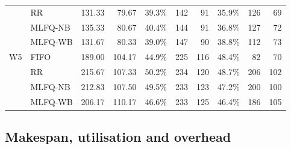 \documentclass[11pt,a4paper]{article}
\begin{document}
\begin{center}
\begin{tabular}{ll rrr rrr rr}
 & RR & 131.33 & 79.67 & 39.3\% & 142 & 91 & 35.9\% & 126 & 69 \\
 & MLFQ-NB & 135.33 & 80.67 & 40.4\% & 144 & 91 & 36.8\% & 127 & 72 \\
 & MLFQ-WB & 131.67 & 80.33 & 39.0\% & 147 & 90 & 38.8\% & 112 & 73 \\
\midrule
W5 & FIFO & 189.00 & 104.17 & 44.9\% & 225 & 116 & 48.4\% & 82 & 70 \\
 & RR & 215.67 & 107.33 & 50.2\% & 234 & 120 & 48.7\% & 206 & 102 \\
 & MLFQ-NB & 212.83 & 107.50 & 49.5\% & 233 & 123 & 47.2\% & 200 & 100 \\
 & MLFQ-WB & 206.17 & 110.17 & 46.6\% & 233 & 125 & 46.4\% & 186 & 105 \\
\bottomrule\end{tabular}\end{center}

\subsection{Makespan, utilisation and overhead}
\end{document}
